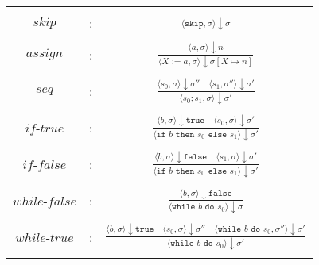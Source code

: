 \begin{tabular}{|c c c|}
 \hline
  & & \\
 $skip$ & : & $
		\frac{}{\langle \texttt{skip}, \sigma \rangle \downarrow \sigma}$ \\
  & & \\
 $assign$ & : & $\frac{
		\langle a, \sigma \rangle \downarrow n
	}{
		\langle X:= a, \sigma \rangle \downarrow \sigma [X \mapsto n]
	} $\\
  & & \\
 $seq$ & : & $\frac{
		\langle s_0, \sigma \rangle \downarrow \sigma '' \quad
    \langle s_1, \sigma '' \rangle \downarrow \sigma'
	}{
		\langle s_0;s_1, \sigma \rangle \downarrow \sigma '
	} $\\
  & & \\
 $if$-$true$ & : & $\frac{
		\langle b, \sigma \rangle \downarrow \texttt{true} \quad
    \langle s_0, \sigma \rangle \downarrow \sigma'
	}{
		\langle \texttt{if } b \texttt{ then } s_0 \texttt{ else } s_1 \rangle \downarrow \sigma '
	} $\\
  & & \\
 $if$-$false$ & : & $\frac{
		\langle b, \sigma \rangle \downarrow \texttt{false} \quad
    \langle s_1, \sigma \rangle \downarrow \sigma'
	}{
		\langle \texttt{if } b \texttt{ then } s_0 \texttt{ else } s_1 \rangle \downarrow \sigma '
	} $\\
  & & \\
 $while$-$false$ & : & $\frac{
		\langle b, \sigma \rangle \downarrow \texttt{false}
	}{
		\langle \texttt{while } b \texttt{ do } s_0 \rangle \downarrow \sigma
	} $\\
  & & \\
 $while$-$true$ & : & $\frac{
		\langle b, \sigma \rangle \downarrow \texttt{true} \quad
		\langle s_0, \sigma \rangle \downarrow \sigma '' \quad
		\langle \texttt{while } b \texttt{ do } s_0, \sigma '' \rangle \downarrow \sigma '
	}{
		\langle \texttt{while } b \texttt{ do } s_0 \rangle \downarrow \sigma '
	}$ \\
  & & \\
 \hline
\end{tabular}
